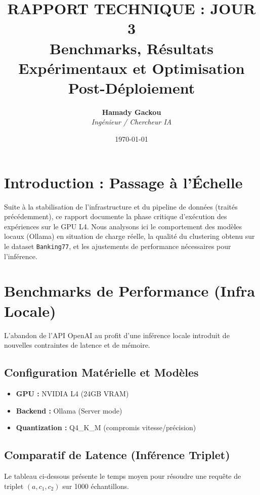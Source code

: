 \documentclass[11pt, a4paper]{article}
\title{
    \vspace{2cm}
    \textbf{\Huge RAPPORT TECHNIQUE : JOUR 3}\\
    \vspace{0.5cm}
    \Large Benchmarks, Résultats Expérimentaux et Optimisation Post-Déploiement
    \vspace{2cm}
}
\author{\textbf{Hamady Gackou} \\ \textit{Ingénieur / Chercheur IA}}
\date{\today}
\begin{document}
\maketitle
\thispagestyle{empty}
\newpage

\tableofcontents
\newpage

\section{Introduction : Passage à l'Échelle}
Suite à la stabilisation de l'infrastructure et du pipeline de données (traités précédemment), ce rapport documente la phase critique d'exécution des expériences sur le GPU L4. Nous analysons ici le comportement des modèles locaux (Ollama) en situation de charge réelle, la qualité du clustering obtenu sur le dataset \texttt{Banking77}, et les ajustements de performance nécessaires pour l'inférence.

\section{Benchmarks de Performance (Infra Locale)}
L'abandon de l'API OpenAI au profit d'une inférence locale introduit de nouvelles contraintes de latence et de mémoire.

\subsection{Configuration Matérielle et Modèles}
\begin{itemize}
    \item \textbf{GPU :} NVIDIA L4 (24GB VRAM)
    \item \textbf{Backend :} Ollama (Server mode)
    \item \textbf{Quantization :} Q4\_K\_M (compromis vitesse/précision)
\end{itemize}

\subsection{Comparatif de Latence (Inférence Triplet)}
Le tableau ci-dessous présente le temps moyen pour résoudre une requête de triplet $(a, c_1, c_2)$ sur 1000 échantillons.
\end{document}

